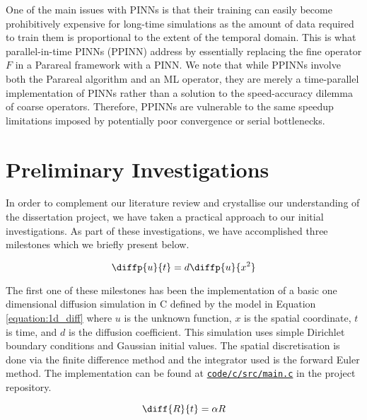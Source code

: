 \documentclass{article}
\begin{document}
One of the main issues with PINNs is that their training can easily become prohibitively expensive for long-time simulations as the amount of data required to train them is proportional to the extent of the temporal domain. This is what parallel-in-time PINNs (PPINN) \cite{meng2019} address by essentially replacing the fine operator $F$ in a Parareal framework with a PINN. We note that while PPINNs involve both the Parareal algorithm and an ML operator, they are merely a time-parallel implementation of PINNs rather than a solution to the speed-accuracy dilemma of coarse operators. Therefore, PPINNs are vulnerable to the same speedup limitations imposed by potentially poor convergence or serial bottlenecks.

\section{Preliminary Investigations}

In order to complement our literature review and crystallise our understanding of the dissertation project, we have taken a practical approach to our initial investigations. As part of these investigations, we have accomplished three milestones which we briefly present below.

\begin{equation}
    \diffp{u}{t} = d \diffp{u}{{x^2}}
\label{equation:1d_diff}
\end{equation}

The first one of these milestones has been the implementation of a basic one dimensional diffusion simulation in C defined by the model in Equation \ref{equation:1d_diff} where $u$ is the unknown function, $x$ is the spatial coordinate, $t$ is time, and $d$ is the diffusion coefficient. This simulation uses simple Dirichlet boundary conditions and Gaussian initial values. The spatial discretisation is done via the finite difference method and the integrator used is the forward Euler method. The implementation can be found at \href{https://git.ecdf.ed.ac.uk/msc-19-20/s1984842/blob/master/code/c/src/main.c}{\texttt{code/c/src/main.c}} in the project repository.

\begin{equation}
    \diff{R}{t} = \alpha R
\label{equation:rabbit_pop}
\end{equation}
\end{document}
